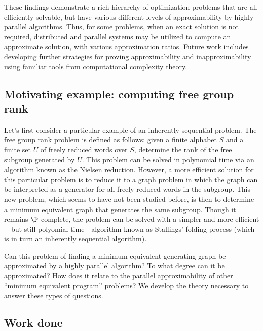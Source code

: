 \documentclass{article}
\begin{document}
%
%
These findings demonstrate a rich hierarchy of optimization problems that are all efficiently solvable, but have various different levels of approximability by highly parallel algorithms.
Thus, for some problems, when an exact solution is not required, distributed and parallel systems may be utilized to compute an approximate solution, with various approximation ratios.
%
%
Future work includes developing further strategies for proving approximability and inapproximability using familiar tools from computational complexity theory.

\subsection{Motivating example: computing free group rank}

Let's first consider a particular example of an inherently sequential problem.
The free group rank problem is defined as follows: given a finite alphabet $S$ and a finite set $U$ of freely reduced words over $S$, determine the rank of the free subgroup generated by $U$.
This problem can be solved in polynomial time via an algorithm known as the Nielsen reduction.
However, a more efficient solution for this particular problem is to reduce it to a graph problem in which the graph can be interpreted as a generator for all freely reduced words in the subgroup.
This new problem, which seems to have not been studied before, is then to determine a minimum equivalent graph that generates the same subgroup.
Though it remains $\P$-complete, the problem can be solved with a simpler and more efficient---but still polyomial-time---algorithm known as Stallings' folding process (which is in turn an inherently sequential algorithm).

Can this problem of finding a minimum equivalent generating graph be approximated by a highly parallel algorithm?
To what degree can it be approximated?
How does it relate to the parallel approximability of other ``minimum equivalent program'' problems?
We develop the theory necessary to answer these types of questions.

\subsection{Work done}
\end{document}
